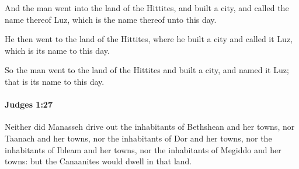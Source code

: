 			\begin{versebox}
					\item[BHS] 
					\item[ASV] And the man went into the land of the Hittites, and built a city, and called the name thereof Luz, which is the name thereof unto this day.
					\item[NIV] He then went to the land of the Hittites, where he built a city and called it Luz, which is its name to this day.
					\item[NRSV] So the man went to the land of the Hittites and built a city, and named it Luz; that is its name to this day.
			\end{versebox}

		\paragraph{Judges 1:27} %
			\label{JUDGES-1-27}

			Neither did Manasseh drive out the inhabitants of Bethshean and her towns, nor Taanach and her towns, nor the inhabitants of Dor and her towns, nor the inhabitants of Ibleam and her towns, nor the inhabitants of Megiddo and her towns: but the Canaanites would dwell in that land.

